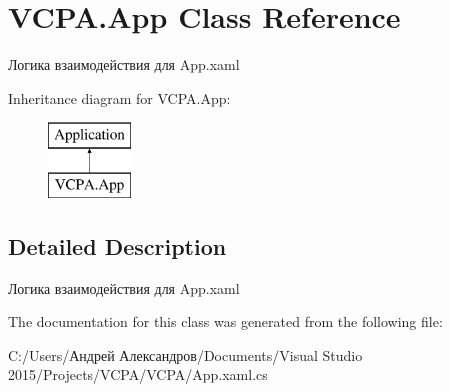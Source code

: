 \hypertarget{class_v_c_p_a_1_1_app}{}\section{V\+C\+P\+A.\+App Class Reference}
\label{class_v_c_p_a_1_1_app}


Логика взаимодействия для App.\+xaml  


Inheritance diagram for V\+C\+P\+A.\+App\+:\begin{figure}[H]
\begin{center}
\leavevmode
\includegraphics[height=2.000000cm]{class_v_c_p_a_1_1_app}
\end{center}
\end{figure}


\subsection{Detailed Description}
Логика взаимодействия для App.\+xaml 



The documentation for this class was generated from the following file\+:\begin{DoxyCompactItemize}
\item 
C\+:/\+Users/Андрей Александров/\+Documents/\+Visual Studio 2015/\+Projects/\+V\+C\+P\+A/\+V\+C\+P\+A/App.\+xaml.\+cs\end{DoxyCompactItemize}
